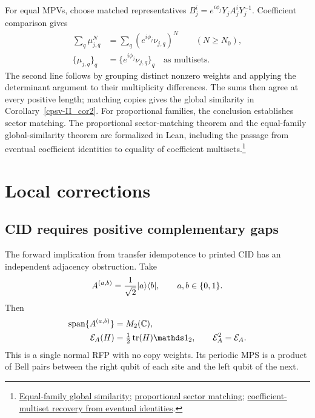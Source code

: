 \documentclass[aps,pra,reprint,nofootinbib,onecolumn]{revtex4-2}
\begin{document}
For equal MPVs, choose matched representatives
$B_j^i=e^{i\phi_j}Y_jA_j^iY_j^{-1}$. Coefficient comparison gives
\begin{align}
	\sum_q\mu_{j,q}^N
	                & =\sum_q(e^{i\phi_j}\nu_{j,q})^N\qquad(N\geq N_0),\nonumber \\
	\{\mu_{j,q}\}_q & =\{e^{i\phi_j}\nu_{j,q}\}_q
	\quad\text{as multisets}.
	\label{eq:multiset-matching}
\end{align}
The second line follows by grouping distinct nonzero weights and
applying the determinant argument to their multiplicity differences.
The sums then agree at every positive length; matching copies
gives the global similarity in Corollary~\ref{cpsv-II_cor2}.
For proportional families, the conclusion establishes sector matching.
The proportional sector-matching theorem and the equal-family
global-similarity theorem are formalized in Lean, including the passage
from eventual coefficient identities to equality of coefficient multisets.\footnote{\href{https://sirui-lu.com/TNLean/docs/TNLean/MPS/FundamentalTheorem/SectorBNT/FundamentalCoord.html\#MPSTensor.fundamentalTheorem_equal_canonicalForm}{Equal-family global similarity}; \href{https://sirui-lu.com/TNLean/docs/TNLean/MPS/FundamentalTheorem/SectorBNT/FundamentalCoord.html\#MPSTensor.fundamentalTheorem_proportional_canonicalForm}{proportional sector matching}; \href{https://sirui-lu.com/TNLean/docs/TNLean/MPS/FundamentalTheorem/SectorBNT/WeightEquiv.html\#MPSTensor.matched_sector_weight_multiset_eq}{coefficient-multiset recovery from eventual identities}.}

\section{Local corrections}\label{sec:local}

\subsection{CID requires positive complementary gaps}

The forward implication from transfer idempotence to printed CID
has an independent adjacency obstruction. Take
\begin{align}
	A^{(a,b)}=\frac1{\sqrt2}\lvert a\rangle\langle b\rvert,
	\qquad a,b\in\{0,1\}.
	\label{eq:bell-tensor}
\end{align}
Then
\begin{align}
	\operatorname{span}\{A^{(a,b)}\} & =M_2(\mathbb C),\nonumber   \\
	\mc E_A(H)                       & =\tfrac12\tr(H)\Id_2,\qquad
	\mc E_A^2=\mc E_A.
	\label{eq:bell-transfer}
\end{align}
This is a single normal RFP with no copy weights. Its periodic
MPS is a product of Bell pairs between the right qubit of each
site and the left qubit of the next.
\end{document}
